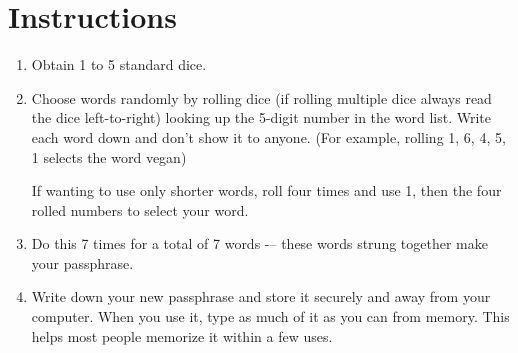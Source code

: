 \documentclass[10pt, oneside]{book}
\begin{document}
	\section*{Instructions}
	\begin{enumerate}
		\item Obtain 1 to 5 standard dice.\\
		\item Choose words randomly by rolling dice (if rolling multiple dice always read the dice left-to-right) looking up the 5-digit number in the word list. Write each word down and don't show it to anyone. (For example, rolling 1, 6, 4, 5, 1 selects the word vegan)\linebreak[2]
		
		If wanting to use only shorter words, roll four times and use 1, then the four rolled numbers to select your word.
		\item Do this 7 times for a total of 7 words -– these words strung together make your passphrase.\\
		\item Write down your new passphrase and store it securely and away from your computer. When you use it, type as much of it as you can from memory. This helps most people memorize it within a few uses.\\
	\end{enumerate}
	\pagebreak
	
\end{document}
